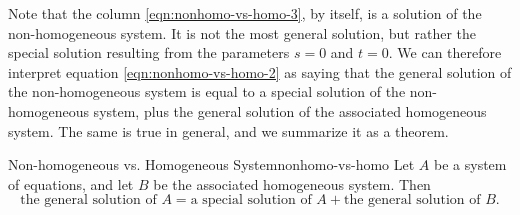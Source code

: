 Note that the column {\eqref{eqn:nonhomo-vs-homo-3}}, by itself, is a
solution of the non-homogeneous system. It is not the most general
solution, but rather the special solution resulting from the
parameters $s=0$ and $t=0$. We can therefore interpret equation
{\eqref{eqn:nonhomo-vs-homo-2}} as saying that the general solution of
the non-homogeneous system is equal to a special solution of the
non-homogeneous system, plus the general solution of the associated
homogeneous system. The same is true in general, and we summarize it
as a theorem.

\begin{theorem}{Non-homogeneous vs. Homogeneous System}{nonhomo-vs-homo}
  Let $A$ be a system of equations, and let $B$ be the associated
  homogeneous system. Then
  \begin{equation*}
    \mbox{the general solution of $A$}
    = \mbox{a special solution of $A$}
    + \mbox{the general solution of $B$}.
  \end{equation*}
\end{theorem}
